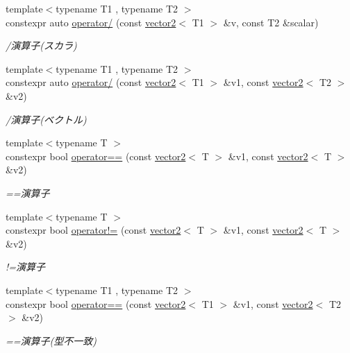 \begin{DoxyCompactItemize}
{\footnotesize template$<$typename T1 , typename T2 $>$ }\\constexpr auto \mbox{\hyperlink{namespacesaki_ab12f7d971656317d7e0502bf64fe762a}{operator/}} (const \mbox{\hyperlink{classsaki_1_1vector2}{vector2}}$<$ T1 $>$ \&v, const T2 \&scalar)
\begin{DoxyCompactList}\small\item\em /演算子(スカラ) \end{DoxyCompactList}\item 
{\footnotesize template$<$typename T1 , typename T2 $>$ }\\constexpr auto \mbox{\hyperlink{namespacesaki_af613b8219c84ed98901c66a082938a61}{operator/}} (const \mbox{\hyperlink{classsaki_1_1vector2}{vector2}}$<$ T1 $>$ \&v1, const \mbox{\hyperlink{classsaki_1_1vector2}{vector2}}$<$ T2 $>$ \&v2)
\begin{DoxyCompactList}\small\item\em /演算子(ベクトル) \end{DoxyCompactList}\item 
{\footnotesize template$<$typename T $>$ }\\constexpr bool \mbox{\hyperlink{namespacesaki_a2aafc5056183a1a522b89497ee3439e9}{operator==}} (const \mbox{\hyperlink{classsaki_1_1vector2}{vector2}}$<$ T $>$ \&v1, const \mbox{\hyperlink{classsaki_1_1vector2}{vector2}}$<$ T $>$ \&v2)
\begin{DoxyCompactList}\small\item\em ==演算子 \end{DoxyCompactList}\item 
{\footnotesize template$<$typename T $>$ }\\constexpr bool \mbox{\hyperlink{namespacesaki_ac0c806d3237b6718e95e9b71f838bcc1}{operator!=}} (const \mbox{\hyperlink{classsaki_1_1vector2}{vector2}}$<$ T $>$ \&v1, const \mbox{\hyperlink{classsaki_1_1vector2}{vector2}}$<$ T $>$ \&v2)
\begin{DoxyCompactList}\small\item\em !=演算子 \end{DoxyCompactList}\item 
{\footnotesize template$<$typename T1 , typename T2 $>$ }\\constexpr bool \mbox{\hyperlink{namespacesaki_a07efea0cf7385fc13c00519e8f0f7732}{operator==}} (const \mbox{\hyperlink{classsaki_1_1vector2}{vector2}}$<$ T1 $>$ \&v1, const \mbox{\hyperlink{classsaki_1_1vector2}{vector2}}$<$ T2 $>$ \&v2)
\begin{DoxyCompactList}\small\item\em ==演算子(型不一致) \end{DoxyCompactList}\item 

\end{DoxyCompactItemize}
